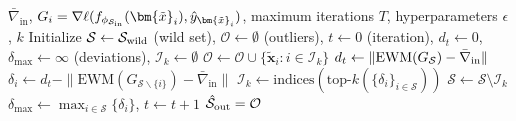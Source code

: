 \documentclass[10pt]{article} %
\theoremstyle{plain}
\theoremstyle{definition}
\begin{document}
\begin{algorithm}[h]
\caption{Iterative Outlier Detection via {\bf Medix}}
\label{alg:Medix}
\begin{algorithmic}[1]
\Require $\bar{\nabla}_{\text{in}}$, $G_i = \nabla \ell (f_{\phi_{{\cal S}_{\text{in}}}}(\bm{\tilde{x}}_{i}), \hat{y}_{\bm{\tilde{x}}_{i}})
   $, maximum iterations $T$,  hyperparameters $\epsilon$, $k$
\State Initialize ${\cal S} \gets \mathcal{S}_{\rm wild}$ (wild set), $\mathcal{\mathcal{O}} \gets \emptyset$ (outliers), $t \gets 0$ (iteration), $d_t \gets 0$, $\delta_{\text{max}} \gets \infty$ (deviations), $\mathcal{\mathcal{I}}_k \gets \emptyset$
    \State $\mathcal{\mathcal{O}} \gets \mathcal{\mathcal{O}} \cup \{\tilde{\bm{x}}_i : i \in \mathcal{\mathcal{I}}_k\}$ 
    \State $d_t \gets \|\text{EWM}(G_{\cal S}) - \bar{\nabla}_{\text{in}}\| $ 
        \State $\delta_i \gets d_t - \|\text{EWM}(G_{\mathcal{S} \backslash \{ i \}}) - \bar{\nabla}_{\text{in}}\| $
    \EndFor
    \State $\mathcal{\mathcal{I}}_k \gets \text{indices} (\text{top-}k(\{\delta_i\}_{i \in \mathcal{S}}))$ 
    \State $\mathcal{S} \gets \mathcal{S} \setminus \mathcal{\mathcal{I}}_k$ 
    \State $\delta_{\text{max}} \gets \max_{i \in \mathcal{S}} \{\delta_i\}$, $t \gets t + 1$ 
\EndWhile
\State \Return $\hat{\mathcal{S}}_{\rm out} = \mathcal{\mathcal{O}}$ 
\end{algorithmic}
\end{algorithm}

\end{document}
